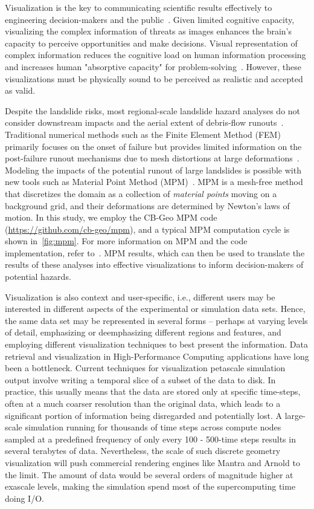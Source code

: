 \documentclass[journal]{IEEEtran}
\begin{document}
Visualization is the key to communicating scientific results effectively to engineering decision-makers and the public~\cite{mayer2005cognitive}. Given limited cognitive capacity, visualizing the complex information of threats as images enhances the brain's capacity to perceive opportunities and make decisions. Visual representation of complex information reduces the cognitive load on human information processing and increases human "absorptive capacity" for problem-solving~\cite{kahneman2012human}. However, these visualizations must be physically sound to be perceived as realistic and accepted as valid.

Despite the landslide risks, most regional-scale landslide hazard analyses do not consider downstream impacts and the aerial extent of debris-flow runouts~\cite{USGS2017debris}. Traditional numerical methods such as the Finite Element Method (FEM) primarily focuses on the onset of failure but provides limited information on the post-failure runout mechanisms due to mesh distortions at large  deformations~\cite{soga2016trends}. Modeling the impacts of the potential runout of large landslides is possible with new tools such as Material Point Method (MPM)~\cite{Bardenhagen2000,Bardenhagen2004,Sulsky1994,Sulsky1995}. MPM is a mesh-free method that discretizes the domain as a collection of \textit{material points} moving on a background grid, and their deformations are determined by Newton's laws of motion. In this study, we employ the CB-Geo MPM code (\url{https://github.com/cb-geo/mpm}), and a typical MPM computation cycle is shown in~\cref{fig:mpm}. For more information on MPM and the code implementation, refer to~\cite{kumar2019scalable}. MPM results, which can then be used to translate the results of these analyses into effective visualizations to inform decision-makers of potential hazards. 

Visualization is also context and user-specific, i.e., different users may be interested in different aspects of the experimental or simulation data sets. Hence, the same data set may be represented in several forms – perhaps at varying levels of detail, emphasizing or deemphasizing different regions and features, and employing different visualization techniques to best present the information. Data retrieval and visualization in High-Performance Computing applications have long been a bottleneck. Current techniques for visualization petascale simulation output involve writing a temporal slice of a subset of the data to disk. In practice, this usually means that the data are stored only at specific time-steps, often at a much coarser resolution than the original data, which leads to a significant portion of information being disregarded and potentially lost. A large-scale simulation running for thousands of time steps across compute nodes sampled at a predefined frequency of only every 100 - 500-time steps results in several terabytes of data. Nevertheless, the scale of such discrete geometry visualization will push commercial rendering engines like Mantra and Arnold to the limit. The amount of data would be several orders of magnitude higher at exascale levels, making the simulation spend most of the supercomputing time doing I/O.
\end{document}

